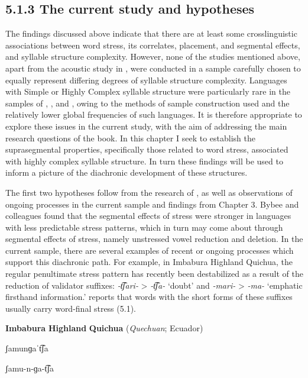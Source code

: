 \subsection{5.1.3 The current study and hypotheses}

  The findings discussed above indicate that there are at least some crosslinguistic associations between word stress, its correlates, placement, and segmental effects, and syllable structure complexity. However, none of the studies mentioned above, apart from the acoustic study in \citet{EasterdayEtAl2011}, were conducted in a sample carefully chosen to equally represent differing degrees of syllable structure complexity. Languages with Simple or Highly Complex syllable structure were particularly rare in the samples of \citet{Auer1993}, \citet{BybeeEtAl1998}, and \citet{Schiering2007}, owing to the methods of sample construction used and the relatively lower global frequencies of such languages. It is therefore appropriate to explore these issues in the current study, with the aim of addressing the main research questions of the book. In this chapter I seek to establish the suprasegmental properties, specifically those related to word stress, associated with highly complex syllable structure. In turn these findings will be used to inform a picture of the diachronic development of these structures.

  The first two hypotheses follow from the research of \citet{BybeeEtAl1998}, as well as observations of ongoing processes in the current sample and findings from Chapter 3. Bybee and colleagues found that the segmental effects of stress were stronger in languages with less predictable stress patterns, which in turn may come about through segmental effects of stress, namely unstressed vowel reduction and deletion. In the current sample, there are several examples of recent or ongoing processes which support this diachronic path. For example, in Imbabura Highland Quichua, the regular penultimate stress pattern has recently been destabilized as a result of the reduction of validator suffixes: \textit{-t͡ʃari-} > \textit{-t͡ʃa-} ‘doubt’ and \textit{-mari-} > \textit{-ma-} ‘emphatic firsthand information.’ \citet{Cole1982} reports that words with the short forms of these suffixes usually carry word-final stress (5.1).

\ea\label{ex:(5.1)}
  \textbf{Imbabura} \textbf{Highland} \textbf{Quichua} (\textit{Quechuan}; Ecuador)

ʃamunɡaˈt͡ʃa

ʃamu-n-ɡa-t͡ʃa

